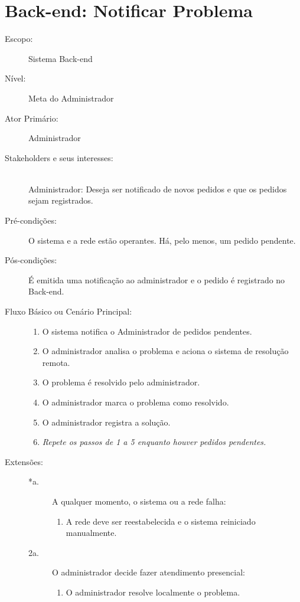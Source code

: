 \documentclass[brazil,times]{abnt}
\begin{document}
\section{Back-end: Notificar Problema}
\begin{description}
\item[Escopo:] Sistema Back-end
\item[Nível:] Meta do Administrador
\item[Ator Primário:] Administrador
\item[Stakeholders e seus interesses:] \hfill \\
Administrador: Deseja ser notificado de novos pedidos e que os pedidos
sejam registrados.
\item[Pré-condições:] O sistema e a rede estão operantes. Há, pelo menos, um pedido 
pendente.
\item[Pós-condições:]  É emitida uma notificação ao administrador e o pedido é        
registrado no Back-end.
\item[Fluxo Básico ou Cenário Principal:]\hfill
\begin{enumerate}
  \item O sistema notifica o Administrador de pedidos pendentes.
  \item O administrador analisa o problema e aciona o sistema de resolução
  remota.
  \item O problema é resolvido pelo administrador.
  \item O administrador marca o problema como resolvido.
  \item O administrador registra a solução.
  \item \emph{Repete os passos de 1 a 5 enquanto houver pedidos pendentes.}
\end{enumerate}

\item[Extensões:]\hfill
\begin{description}
	\item[*a.] A qualquer momento, o sistema ou a rede falha: \hfill
	\begin{enumerate}
 		\item A rede deve ser reestabelecida e o sistema
 		reiniciado manualmente.
	\end{enumerate} 

	\item[2a.] O administrador decide fazer atendimento presencial:
	\begin{enumerate}
  		\item O administrador resolve localmente o problema.
	\end{enumerate}


\end{description}
\end{description}
\end{document}
